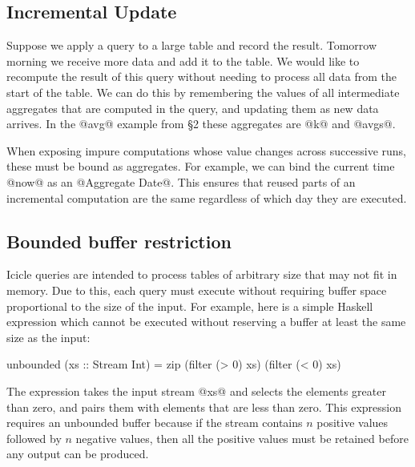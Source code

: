 \subsection{Incremental Update}

Suppose we apply a query to a large table and record the result. Tomorrow morning we receive more data and add it to the table. We would like to recompute the result of this query without needing to process all data from the start of the table. We can do this by remembering the values of all intermediate aggregates that are computed in the query, and updating them as new data arrives. In the @avg@ example from \S2 these aggregates are @k@ and @avgs@. 

When exposing impure computations whose value changes across successive runs, these must be bound as aggregates.
For example, we can bind the current time @now@ as an @Aggregate Date@.
This ensures that reused parts of an incremental computation are the same regardless of which day they are executed.



\subsection{Bounded buffer restriction}
\label{s:IcicleSource:bounded}
Icicle queries are intended to process tables of arbitrary size that may not fit in memory. Due to this, each query must execute without requiring buffer space proportional to the size of the input. For example, here is a simple Haskell expression which cannot be executed without reserving a buffer at least the same size as the input:
\begin{code}
    unbounded (xs :: Stream Int)
     = zip (filter (> 0) xs) (filter (< 0) xs)
\end{code}

The expression takes the input stream @xs@ and selects the elements greater than zero, and pairs them with elements that are less than zero. This expression requires an unbounded buffer because if the stream contains $n$ positive values followed by $n$ negative values, then all the positive values must be retained before any output can be produced. 

